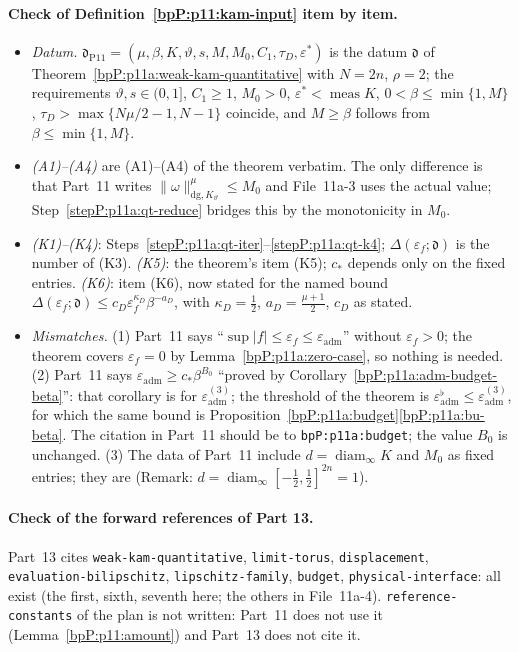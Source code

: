 \paragraph{Check of Definition~\ref{bpP:p11:kam-input} item by item.}
\begin{itemize}
\item \emph{Datum.} $\mathfrak d_{\mathrm{P11}}=(\mu,\beta,K,\vartheta,s,M,M_0,C_1,\tau_D,\varepsilon^*)$ is the datum $\mathfrak d$ of Theorem~\ref{bpP:p11a:weak-kam-quantitative} with $N=2n$, $\rho=2$; the requirements $\vartheta,s\in(0,1]$, $C_1\ge1$, $M_0>0$, $\varepsilon^*<\operatorname{meas}K$, $0<\beta\le\min\{1,M\}$, $\tau_D>\max\{N\mu/2-1,N-1\}$ coincide, and $M\ge\beta$ follows from $\beta\le\min\{1,M\}$.
\item \emph{(A1)--(A4)} are (A1)--(A4) of the theorem verbatim. The only difference is that Part~11 writes $\lVert\omega\rVert^\mu_{\mathrm{dg},K_\vartheta}\le M_0$ and File~11a-3 uses the actual value; Step~\ref{stepP:p11a:qt-reduce} bridges this by the monotonicity in $M_0$.
\item \emph{(K1)--(K4)}: Steps~\ref{stepP:p11a:qt-iter}--\ref{stepP:p11a:qt-k4}; $\Delta(\varepsilon_f;\mathfrak d)$ is the number of (K3). \emph{(K5)}: the theorem's item (K5); $c_*$ depends only on the fixed entries. \emph{(K6)}: item (K6), now stated for the named bound $\Delta(\varepsilon_f;\mathfrak d)\le c_D\varepsilon_f^{\kappa_D}\beta^{-a_D}$, with $\kappa_D=\frac12$, $a_D=\frac{\mu+1}2$, $c_D$ as stated.
\item \emph{Mismatches.} (1) Part~11 says ``$\sup\lvert f\rvert\le\varepsilon_f\le\varepsilon_{\mathrm{adm}}$'' without $\varepsilon_f>0$; the theorem covers $\varepsilon_f=0$ by Lemma~\ref{bpP:p11a:zero-case}, so nothing is needed. (2) Part~11 says $\varepsilon_{\mathrm{adm}}\ge c_*\beta^{B_0}$ ``proved by Corollary~\ref{bpP:p11a:adm-budget-beta}'': that corollary is for $\varepsilon^{(3)}_{\mathrm{adm}}$; the threshold of the theorem is $\varepsilon^\flat_{\mathrm{adm}}\le\varepsilon^{(3)}_{\mathrm{adm}}$, for which the same bound is Proposition~\ref{bpP:p11a:budget}\ref{bpP:p11a:bu-beta}. The citation in Part~11 should be to \texttt{bpP:p11a:budget}; the value $B_0$ is unchanged. (3) The data of Part~11 include $d=\operatorname{diam}_\infty K$ and $M_0$ as fixed entries; they are (Remark: $d=\operatorname{diam}_\infty[-\tfrac12,\tfrac12]^{2n}=1$).
\end{itemize}

\paragraph{Check of the forward references of Part 13.} Part~13 cites \texttt{weak-kam-quantitative}, \texttt{limit-torus}, \texttt{displacement}, \texttt{evaluation-bilipschitz}, \texttt{lipschitz-family}, \texttt{budget}, \texttt{physical-interface}: all exist (the first, sixth, seventh here; the others in File~11a-4). \texttt{reference-constants} of the plan is not written: Part~11 does not use it (Lemma~\ref{bpP:p11:amount}) and Part~13 does not cite it.


